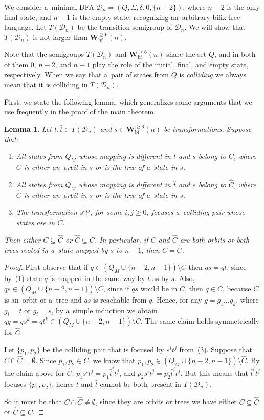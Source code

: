 \documentclass{amsart}
\newtheorem{lemma}[theorem]{Lemma}
\renewcommand{\ge}{\geqslant}
\newcommand{\Wbf}{\mathbf{W}^{\ge 6}_{\mathrm{bf}}}
\newcommand{\e}[1]{\hat{#1}}
\newcommand{\cD}{{\mathcal D}}
\begin{document}
We consider a~minimal DFA $\cD_n=(Q,\Sigma,\delta,0,\{n-2\})$, where $n-2$ is the only final state, and $n-1$ is the empty state, recognizing an~arbitrary bifix-free language.
Let $T(\cD_n)$ be the transition semigroup of $\cD_n$.
We will show that $T(\cD_n)$ is not larger than $\Wbf(n)$.

Note that the semigroups $T(\cD_n)$ and $\Wbf(n)$ share the set $Q$, and in both of them $0$, $n-2$, and $n-1$ play the role of the initial, final, and empty state, respectively.
When we say that a~pair of states from $Q$ is \emph{colliding} we always mean that it is colliding in $T(\cD_n)$.

First, we state the following lemma, which generalizes some arguments that we use frequently in the proof of the main theorem.
\begin{lemma}\label{lem:orbits}
Let $t,\e{t} \in T(\cD_n)$ and $s \in \Wbf(n)$ be transformations.
Suppose that:
\begin{enumerate}
\item All states from $Q_M$ whose mapping is different in $t$ and $s$ belong to $C$, where $C$ is either an~orbit in $s$ or is the tree of a~state in $s$.
\item All states from $Q_M$ whose mapping is different in $\e{t}$ and $s$ belong to $\e{C}$, where $\e{C}$ is either an~orbit in $s$ or is the tree of a~state in $s$.
\item The transformation $s^i t^j$, for some $i,j \ge 0$, focuses a~colliding pair whose states are in $C$.
\end{enumerate}
Then either $C \subseteq \e{C}$ or $\e{C} \subseteq C$.
In particular, if $C$ and $\e{C}$ are both orbits or both trees rooted in a~state mapped by $s$ to $n-1$, then $C = \e{C}$.
\end{lemma}
\begin{proof}
First observe that if $q \in (Q_M \cup \{n-2,n-1\}) \setminus C$ then $qs = qt$, since by~(1) state $q$ is mapped in the same way by $t$ as by $s$.
Also, $qs \in (Q_M \cup \{n-2,n-1\}) \setminus C$, since if $qs$ would be in $C$, then $q \in C$, because $C$ is an~orbit or a~tree and $qs$ is reachable from $q$.
Hence, for any $g=g_1 \dots g_k$, where $g_i = t$ or $g_i = s$, by a~simple induction we obtain $q g = q s^k = q t^k \in (Q_M \cup \{n-2,n-1\}) \setminus C$.
The same claim holds symmetrically for $\e{C}$.

Let $\{p_1,p_2\}$ be the colliding pair that is focused by $s^i t^j$ from~(3).
Suppose that $C \cap \e{C} = \emptyset$.
Since $p_1,p_2 \in C$, we know that $p_1,p_2 \in (Q_M \cup \{n-2,n-1\}) \setminus \e{C}$.
By the claim above for $\e{C}$, $p_1 s^i t^j = p_1 \e{t}^i t^j$, and $p_2 s^i t^j = p_2 \e{t}^i t^j$.
But this means that $\e{t}^i t^j$ focuses $\{p_1,p_2\}$, hence $t$ and $\e{t}$ cannot be both present in $T(\cD_n)$.

So it must be that $C \cap \e{C} \neq \emptyset$, since they are orbits or trees we have either $C \subseteq \e{C}$ or $\e{C} \subseteq C$.
\end{proof}
\end{document}
